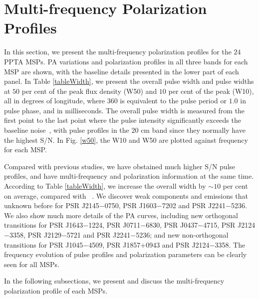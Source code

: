 \documentclass[useAMS,usenatbib]{mn2e}
\begin{document}
\section{Multi-frequency Polarization Profiles}

In this section, we present the multi-frequency polarization profiles for 
the $24$ PPTA MSPs. 
%
PA variations and polarization profiles in all three bands for each MSP 
are shown, with the baseline details presented in the lower part of each 
panel.
%
In Table \ref{tableWidth}, we present the overall pulse width and pulse 
widths at $50$ per cent of the peak flux density (W50) and $10$ per cent 
of the peak (W10), all in degrees of longitude, where $360$ is equivalent 
to the pulse period or $1.0$ in pulse phase, and in milliseconds.
%
The overall pulse width is measured from the first point to the last point 
where the pulse intensity significantly exceeds the baseline 
noise~\citet{Yan11}, with pulse profiles in the $20$ cm band since they 
normally have the highest S/N.
%
%
%
In Fig. \ref{w50}, the W10 and W50 are plotted against frequency for each MSP. 
%

Compared with previous studies, we have obstained much higher S/N pulse 
profiles, and have multi-frequency and polarization information at the same 
time.
%
According to Table \ref{tableWidth}, we increase the overall width by $\sim10$ per 
cent on average, compared with ~\citet{Yan11}. 
%
We discover weak components and emissions that unknown before for PSR J2145$-$0750, 
PSR J1603$-$7202 and PSR J2241$-$5236.
%
We also show much more details of the PA curves, including new orthogonal 
transitions for PSR J1643$-$1224, PSR J0711$-$6830, PSR J0437$-$4715, PSR J2124$-$3358, 
PSR J2129$-$5721 and PSR J2241$-$5236; and new non-orthogonal transitions for 
PSR J1045$-$4509, PSR J1857$+$0943 and PSR J2124$-$3358.
%
The frequency evolution of pulse profiles and polarization parameters 
can be clearly seen for all MSPs.

In the following subsections, we present and discuss the multi-frequency 
polarization profile of each MSPs.
%
\end{document}
